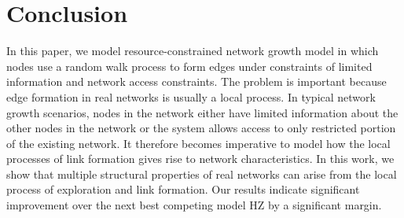 \section{Conclusion}
\label{sec:Conclusion}
In this paper, we model resource-constrained network growth model in which nodes
use a random walk process to form edges under constraints of limited information
and network access constraints. The problem is important because edge formation
in real networks is usually a local process. In typical network growth
scenarios, nodes in the network either have limited information about the other
nodes in the network or the system allows access to only restricted portion of
the existing network. It therefore becomes imperative to model how the local
processes of link formation gives rise to network characteristics. In this work,
we show that multiple structural properties of real networks can arise from the
local process of exploration and link formation. Our results indicate significant
improvement over the next best competing model \textsc{HZ}
\cite{herrera2011generating} by a significant margin.